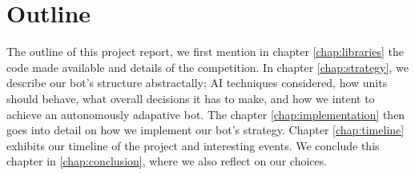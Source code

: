 \section{Outline}
The outline of this project report, we first mention in chapter \ref{chap:libraries} the code made available and details of the competition. In chapter \ref{chap:strategy}, we describe our bot's structure abstractally; AI techniques considered, how units should behave, what overall decisions it has to make, and how we intent to achieve an autonomously adapative bot. The chapter \ref{chap:implementation} then goes into detail on how we implement our bot's strategy. Chapter \ref{chap:timeline} exhibits our timeline of the project and interesting events. We conclude this chapter in \ref{chap:conclusion}, where we also reflect on our choices.







%
